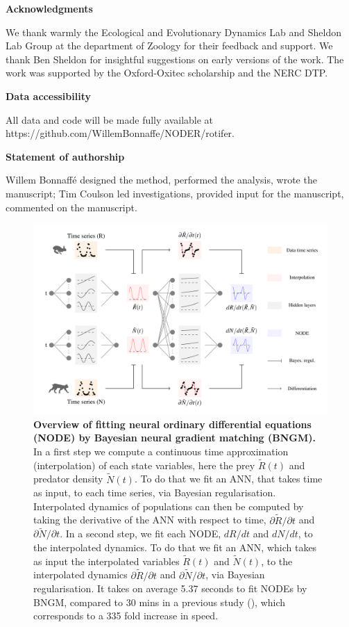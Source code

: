\documentclass[11pt, oneside]{article}
\begin{document}
\textbf{Acknowledgments}

We thank warmly the Ecological and Evolutionary Dynamics Lab and Sheldon Lab Group at the department of Zoology for their feedback and support.
We thank Ben Sheldon for insightful suggestions on early versions of the work.
The work was supported by the Oxford-Oxitec scholarship and the NERC DTP.

\textbf{Data accessibility}

All data and code will be made fully available at https://github.com/WillemBonnaffe/NODER/rotifer.

\textbf{Statement of authorship}

Willem Bonnaff\'e designed the method, performed the analysis, wrote the manuscript; 
Tim Coulson led investigations, provided input for the manuscript, commented on the manuscript.

\printbibliography 

\newpage
{}

\newpage
\begin{figure}[H]
\includegraphics[width=\linewidth,page=1]{figures/main.pdf}
\caption{
    \textbf{Overview of fitting neural ordinary differential equations (NODE) by Bayesian neural gradient matching (BNGM).}
    In a first step we compute a continuous time approximation (interpolation) of each state variables, here the prey $\tilde{R}(t)$ and predator density $\tilde{N}(t)$.
    To do that we fit an ANN, that takes time as input, to each time series, via Bayesian regularisation.
    Interpolated dynamics of populations can then be computed by taking the derivative of the ANN with respect to time, $\partial\tilde{R}/\partial t$ and $\partial\tilde{N}/\partial t$.
    In a second step, we fit each NODE, $dR/dt$ and $dN/dt$, to the interpolated dynamics.
    To do that we fit an ANN, which takes as input the interpolated variables $\tilde{R}(t)$ and $\tilde{N}(t)$, to the interpolated dynamics $\partial\tilde{R}/\partial t$ and $\partial\tilde{N}/\partial t$, via Bayesian regularisation.
    It takes on average 5.37 seconds to fit NODEs by BNGM, compared to 30 mins in a previous study (\cite{Bonnaffe2021a}), which corresponds to a 335 fold increase in speed.
}
\end{figure}
\newpage
\end{document}
